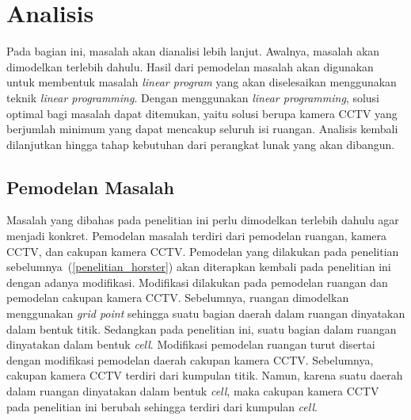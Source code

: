 \chapter{Analisis}
Pada bagian ini, masalah akan dianalisi lebih lanjut. Awalnya, masalah akan dimodelkan terlebih dahulu. Hasil dari pemodelan masalah akan digunakan untuk membentuk masalah \textit{linear program} yang akan diselesaikan menggunakan teknik \textit{linear programming}. Dengan menggunakan \textit{linear programming}, solusi optimal bagi masalah dapat ditemukan, yaitu solusi berupa kamera CCTV yang berjumlah minimum yang dapat mencakup seluruh isi ruangan. Analisis kembali dilanjutkan hingga tahap kebutuhan dari perangkat lunak yang akan dibangun.

\section{Pemodelan Masalah}
Masalah yang dibahas pada penelitian ini perlu dimodelkan terlebih dahulu agar menjadi konkret. Pemodelan masalah terdiri dari pemodelan ruangan, kamera CCTV, dan cakupan kamera CCTV. Pemodelan yang dilakukan pada penelitian sebelumnya~(\ref{penelitian_horster}) akan diterapkan kembali pada penelitian ini dengan adanya modifikasi. Modifikasi dilakukan pada pemodelan ruangan dan pemodelan cakupan kamera CCTV. Sebelumnya, ruangan dimodelkan menggunakan \textit{grid point} sehingga suatu bagian daerah dalam ruangan dinyatakan dalam bentuk titik. Sedangkan pada penelitian ini, suatu bagian dalam ruangan dinyatakan dalam bentuk \textit{cell}. Modifikasi pemodelan ruangan turut disertai dengan modifikasi pemodelan daerah cakupan kamera CCTV. Sebelumnya, cakupan kamera CCTV terdiri dari kumpulan titik. Namun, karena suatu daerah dalam ruangan dinyatakan dalam bentuk \textit{cell}, maka cakupan kamera CCTV pada penelitian ini berubah sehingga terdiri dari kumpulan \textit{cell}.



